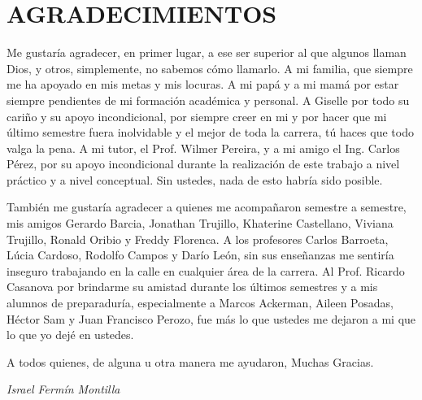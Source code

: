 \chapter*{AGRADECIMIENTOS}

Me gustaría agradecer, en primer lugar, a ese ser superior al que algunos llaman Dios, y otros, simplemente, no sabemos cómo llamarlo. A mi familia, que siempre me ha apoyado en mis metas y mis locuras. A mi papá y a mi mamá por estar siempre pendientes de mi formación académica y personal. A Giselle por todo su cariño y su apoyo incondicional, por siempre creer en mi y por hacer que mi último semestre fuera inolvidable y el mejor de toda la carrera, tú haces que todo valga la pena. A mi tutor, el Prof. Wilmer Pereira, y a mi amigo el Ing. Carlos Pérez, por su apoyo incondicional durante la realización de este trabajo a nivel práctico y a nivel conceptual. Sin ustedes, nada de esto habría sido posible.

También me gustaría agradecer a quienes me acompañaron semestre a semestre, mis amigos Gerardo Barcia, Jonathan Trujillo, Khaterine Castellano, Viviana Trujillo, Ronald Oribio y Freddy Florenca. A los profesores Carlos Barroeta, Lúcia Cardoso, Rodolfo Campos y Darío León, sin sus enseñanzas me sentiría inseguro trabajando en la calle en cualquier área de la carrera. Al Prof. Ricardo Casanova por brindarme su amistad durante los últimos semestres y a mis alumnos de preparaduría, especialmente a Marcos Ackerman, Aileen Posadas, Héctor Sam y Juan Francisco Perozo, fue más lo que ustedes me dejaron a mi que lo que yo dejé en ustedes.

A todos quienes, de alguna u otra manera me ayudaron,
Muchas Gracias.


\begin{flushright}
\textit{Israel Fermín Montilla}
\end{flushright}
